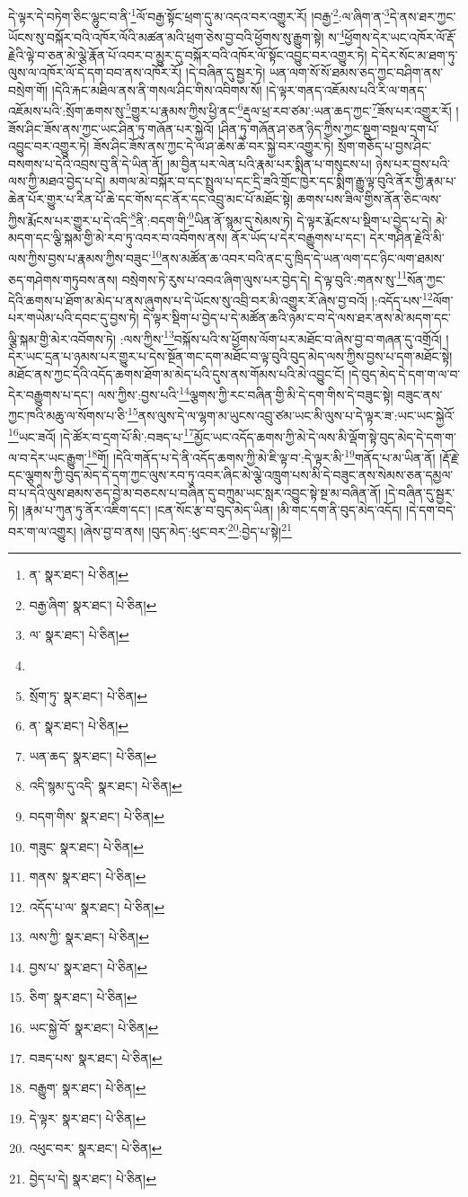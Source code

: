 དེ་ལྟར་དེ་བཏེག་ཅིང་ལྷུང་བ་ནི་\footnote{ན་  སྣར་ཐང་།  པེ་ཅིན། }ལོ་བརྒྱ་སྟོང་ཕྲག་དུ་མ་འདའ་བར་འགྱུར་རོ། །བརྒྱ་\footnote{བརྒྱ་ཞིག་  སྣར་ཐང་།  པེ་ཅིན། }:ལ་ཞིག་ན་\footnote{ལ་  སྣར་ཐང་།  པེ་ཅིན། }དེ་ནས་ཐར་ཀྱང་ཡོངས་སུ་བསྐོར་བའི་འཁོར་ལོའི་མཚན་མའི་ཕྲག་ཅེས་བྱ་བའི་ཕྱོགས་སུ་རྒྱུག་སྟེ། ས་\footnote{}ཕྱོགས་དེར་ཡང་འཁོར་ལོ་རྡོ་རྗེའི་ལྟེ་བ་ཅན་མེ་ལྕེ་རྣོན་པོ་འབར་བ་མྱུར་དུ་བསྐོར་བའི་འཁོར་ལོ་སྟོང་འབྱུང་བར་འགྱུར་ཏེ། དེ་དེར་སོང་མ་ཐག་ཏུ་ལུས་ལ་འཁོར་ལོ་དེ་དག་བབ་ནས་འཁོར་རོ། །དེ་བཞིན་དུ་སྦྱར་ཏེ། ཡན་ལག་སོ་སོ་ཐམས་ཅད་ཀྱང་བཤིག་ནས་བསྲེག་གོ། །དེའི་རྐང་མཐིལ་ནས་ནི་གསལ་ཤིང་གིས་འབིགས་སོ། །དེ་ལྟར་གནད་འཇོམས་པའི་རི་ལ་གནད་འཇོམས་པའི་:སྲོག་ཆགས་སུ་\footnote{སྲོག་ཏུ་  སྣར་ཐང་།  པེ་ཅིན། }གྱུར་པ་རྣམས་ཀྱིས་ཕྱི་ནང་\footnote{ན་  སྣར་ཐང་།  པེ་ཅིན། }རྡུལ་ཕྲ་རབ་ཙམ་:ཡན་ཆད་ཀྱང་\footnote{ཡན་ཆད་  སྣར་ཐང་།  པེ་ཅིན། }ཟོས་པར་འགྱུར་རོ། །ཟོས་ཤིང་ཟོས་ནས་ཀྱང་ཡང་ཤིན་ཏུ་གཞོན་པར་སྐྱེའོ། །ཤིན་ཏུ་གཞོན་ཤ་ཅན་ཉིད་ཀྱིས་ཀྱང་སྡུག་བསྔལ་དྲག་པོ་འབྱུང་བར་འགྱུར་ཏེ། ཟོས་ཤིང་ཟོས་ནས་ཀྱང་དེ་ལ་ཤ་ཆེས་ཆེ་བར་སྐྱེ་བར་འགྱུར་ཏེ། སྲོག་གཅོད་པ་བྱས་ཤིང་བསགས་པ་དེའི་འབྲས་བུ་ནི་དེ་ཡིན་ནོ། །མ་བྱིན་པར་ལེན་པའི་རྣམ་པར་སྨིན་པ་གསུངས་པ། ཉེས་པར་བྱས་པའི་ལས་ཀྱི་མཐའ་བྱེད་པ་དེ། མགལ་མེ་བསྐོར་བ་དང་སྤྲུལ་པ་དང་དྲི་ཟའི་གྲོང་ཁྱེར་དང་སྨིག་རྒྱུ་ལྟ་བུའི་ནོར་གྱི་རྣམ་པ་ཆེན་པོར་གྱུར་པ་རིན་པོ་ཆེ་དང་གོས་དང་ནོར་དང་འབྲུ་མང་པོ་མཐོང་སྟེ། ཆགས་པས་ཟིལ་གྱིས་ནོན་ཅིང་ལས་ཀྱིས་རྨོངས་པར་གྱུར་པ་དེ་འདི་\footnote{འདི་སྙམ་དུ་འདི་  སྣར་ཐང་།  པེ་ཅིན། }ནི་:བདག་གི་\footnote{བདག་གིས་  སྣར་ཐང་།  པེ་ཅིན། }ཡིན་ནོ་སྙམ་དུ་སེམས་ཏེ། དེ་ལྟར་རྨོངས་པ་སྡིག་པ་བྱེད་པ་དེ། མེ་མདག་དང་ལྕི་སྐམ་གྱི་མེ་རབ་ཏུ་འབར་བ་འབོགས་ནས། ནོར་ཡོད་པ་དེར་བརྒྱུགས་པ་དང་། དེར་གཤིན་རྗེའི་མི་ལས་ཀྱིས་བྱས་པ་རྣམས་ཀྱིས་བཟུང་\footnote{གཟུང་  སྣར་ཐང་།  པེ་ཅིན། }ནས་མཚོན་ཆ་འབར་བའི་ནང་དུ་ཁྲིད་དེ་ཡན་ལག་དང་ཉིང་ལག་ཐམས་ཅད་གཤེགས་གཏུབས་ནས། བསྲེགས་ཏེ་རུས་པ་འབའ་ཞིག་ལུས་པར་བྱེད་དེ། དེ་ལྟ་བུའི་:གནས་སུ་\footnote{གནས་  སྣར་ཐང་།  པེ་ཅིན། }སོན་ཀྱང་དེའི་ཆགས་པ་ཐོག་མ་མེད་པ་ནས་ཞུགས་པ་དེ་ཡོངས་སུ་འབྲི་བར་མི་འགྱུར་རོ་ཞེས་བྱ་བའོ། །:འདོད་པས་\footnote{འདོད་པ་ལ་  སྣར་ཐང་།  པེ་ཅིན། }ལོག་པར་གཡེམ་པའི་དབང་དུ་བྱས་ཏེ། དེ་ལྟར་སྡིག་པ་བྱེད་པ་དེ་མཚོན་ཆའི་ཉམ་ང་བ་དེ་ལས་ཐར་ནས་མེ་མདག་དང་ལྕི་སྐམ་གྱི་མེར་འབོགས་ཏེ། :ལས་ཀྱིས་\footnote{ལས་ཀྱི་  སྣར་ཐང་།  པེ་ཅིན། }བསྐོས་པའི་ས་ཕྱོགས་ལོག་པར་མཐོང་བ་ཞེས་བྱ་བ་གཞན་དུ་འགྲོའོ། །དེར་ཡང་དྲན་པ་ཉམས་པར་གྱུར་པ་དེས་སྔོན་གང་དག་མཐོང་བ་ལྟ་བུའི་བུད་མེད་ལས་ཀྱིས་བྱས་པ་དག་མཐོང་སྟེ། མཐོང་ནས་ཀྱང་དེའི་འདོད་ཆགས་ཐོག་མ་མེད་པའི་དུས་ནས་གོམས་པའི་མེ་འབྱུང་ངོ། །དེ་བུད་མེད་དེ་དག་ག་ལ་བ་དེར་བརྒྱུགས་པ་དང་། ལས་ཀྱིས་:བྱས་པའི་\footnote{བྱས་པ་  སྣར་ཐང་།  པེ་ཅིན། }ལྕགས་ཀྱི་རང་བཞིན་གྱི་མི་དེ་དག་གིས་དེ་བཟུང་སྟེ། བཟུང་ནས་ཀྱང་ཁའི་མཆུ་ལ་སོགས་པ་ཅི་\footnote{ཅིག་  སྣར་ཐང་།  པེ་ཅིན། }ནས་ལུས་དེ་ལ་ལྷག་མ་ཡུངས་འབྲུ་ཙམ་ཡང་མི་ལུས་པ་དེ་ལྟར་ཟ་:ཡང་ཡང་སྐྱེའོ་\footnote{ཡང་སྐྱེ་བོ་  སྣར་ཐང་།  པེ་ཅིན། }ཡང་ཟའོ། །དེ་ཚོར་བ་དྲག་པོ་མི་:བཟད་པ་\footnote{བཟད་པས་  སྣར་ཐང་།  པེ་ཅིན། }མྱོང་ཡང་འདོད་ཆགས་ཀྱི་མེ་དེ་ལས་མི་ལྡོག་སྟེ་བུད་མེད་དེ་དག་ག་ལ་བ་དེར་ཡང་རྒྱུག་\footnote{བརྒྱུག་  སྣར་ཐང་།  པེ་ཅིན། }གོ། །དེའི་གནོད་པ་དེ་ནི་འདོད་ཆགས་ཀྱི་མེ་ཇི་ལྟ་བ་:དེ་ལྟར་མི་\footnote{དེ་ལྟར་  སྣར་ཐང་།  པེ་ཅིན། }གནོད་པ་མ་ཡིན་ནོ། །རྡོ་རྗེ་དང་ལྕགས་ཀྱི་བུད་མེད་དེ་དག་ཀྱང་ལུས་རབ་ཏུ་འབར་ཞིང་མེ་ལྕེ་འཁྲུག་པས་མི་དེ་བཟུང་ནས་སེམས་ཅན་དམྱལ་བ་པ་དེའི་ལུས་ཐམས་ཅད་བྱེ་མ་བཅངས་པ་བཞིན་དུ་བཀྲུམ་ཡང་སླར་འབྱུང་སྟེ་སྔ་མ་བཞིན་ནོ། །དེ་བཞིན་དུ་སྦྱར་ཏེ། །རྣམ་པ་ཀུན་ཏུ་ནོར་འཇིག་དང་། །ངན་སོང་རྩ་བ་བུད་མེད་ཡིན། །མི་གང་དག་ནི་བུད་མེད་འདོད། །དེ་དག་བདེ་བར་ག་ལ་འགྱུར། །ཞེས་བྱ་བ་ནས། །བུད་མེད་:ཕུང་བར་\footnote{འཕུང་བར་  སྣར་ཐང་།  པེ་ཅིན། }:བྱེད་པ་སྟེ།\footnote{བྱེད་པ་དེ།  སྣར་ཐང་།  པེ་ཅིན། } 